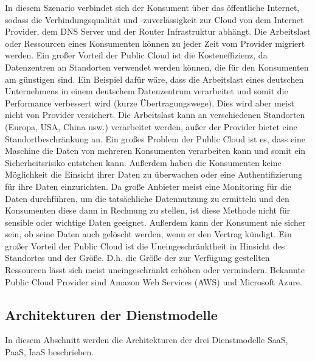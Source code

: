 In diesem Szenario verbindet sich der Konsument über das öffentliche Internet, sodass die Verbindungsqualität und -zuverlässigkeit zur Cloud
von dem Internet Provider, dem DNS Server und der Router Infrastruktur abhängt. Die Arbeitslast oder Ressourcen eines Konsumenten können zu jeder Zeit
vom Provider migriert werden. Ein großer Vorteil der Public Cloud ist die Kosteneffizienz, da Datenzentren an Standorten verwendet werden können, die für den Konsumenten am günstigen sind.
Ein Beispiel dafür wäre, dass die Arbeitslast eines deutschen Unternehmens in einem deutschem Datenzentrum verarbeitet und somit die Performance verbessert wird (kurze Übertragungswege).
Dies wird aber meist nicht von Provider versichert. Die Arbeitslast kann an verschiedenen Standorten (Europa, USA, China usw.) verarbeitet werden, außer der Provider bietet eine
Standortbeschränkung an. Ein großes Problem der Public Cloud ist es, dass eine Maschine die Daten von mehreren Konsumenten verarbeiten kann und somit ein Sicherheitsrisiko entstehen kann.
Außerdem haben die Konsumenten keine Möglichkeit die Einsicht ihrer Daten zu überwachen oder eine Authentifizierung für ihre Daten einzurichten. Da große Anbieter meist eine Monitoring für die
Daten durchführen, um die tatsächliche Datennutzung zu ermitteln und den Konsumenten diese dann in Rechnung zu stellen, ist diese Methode nicht für sensible oder wichtige Daten geeignet.
Außerdem kann der Konsument nie sicher sein, ob seine Daten auch gelöscht werden, wenn er den Vertrag kündigt. 
Ein großer Vorteil der Public Cloud ist die Uneingeschränktheit in Hinsicht des Standortes und der Größe. D.h. die Größe der zur Verfügung gestellten Ressourcen lässt sich 
meist \glqq uneingeschränkt\grqq{} erhöhen oder vermindern\cite{Badger}.
Bekannte Public Cloud Provider sind Amazon Web Services (AWS) und Microsoft Azure. 

\subsection{Architekturen der Dienstmodelle}
In diesem Abschnitt werden die Architekturen der drei Dienstmodelle SaaS, PaaS, IaaS beschrieben.

